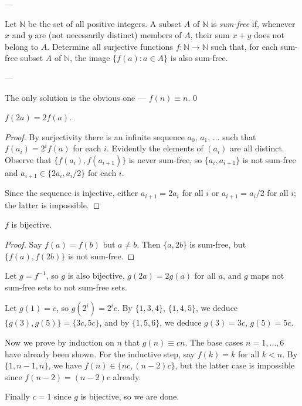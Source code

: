 
---

Let $\mathbb N$ be the set of all positive integers. A subset $A$ of $\mathbb N$ is \emph{sum-free} if, whenever $x$ and $y$ are (not necessarily distinct) members of $A$, their sum $x+y$ does not belong to $A$. Determine all surjective functions $f:\mathbb N\to\mathbb N$ such that, for each sum-free subset $A$ of $\mathbb N$, the image $\{f(a):a\in A\}$ is also sum-free.

---

The only solution is the obvious one --- $f(n)\equiv n$.
\setcounter{claim}0
\begin{claim}
    $f(2a)=2f(a)$.
\end{claim}
\begin{proof}
    By surjectivity there is an infinite sequence $a_0$, $a_1$, $\ldots$ such that $f(a_i)=2^if(a)$ for each $i$. Evidently the elements of $(a_i)$ are all distinct. Observe that $\{f(a_i),f(a_{i+1})\}$ is never sum-free, so $\{a_i,a_{i+1}\}$ is not sum-free and $a_{i+1}\in\{2a_i,a_i/2\}$ for each $i$.

    Since the sequence is injective, either $a_{i+1}=2a_i$ for all $i$ or $a_{i+1}=a_i/2$ for all $i$; the latter is impossible.
\end{proof}
\begin{claim}
    $f$ is bijective.
\end{claim}
\begin{proof}
    Say $f(a)=f(b)$ but $a\ne b$. Then $\{a,2b\}$ is sum-free, but $\{f(a),f(2b)\}$ is not sum-free.
\end{proof}

Let $g=f^{-1}$, so $g$ is also bijective, $g(2a)=2g(a)$ for all $a$, and $g$ maps not sum-free sets to not sum-free sets.

Let $g(1)=c$, so $g(2^i)=2^ic$. By $\{1,3,4\}$, $\{1,4,5\}$, we deduce $\{g(3),g(5)\}=\{3c,5c\}$, and by $\{1,5,6\}$, we deduce $g(3)=3c$, $g(5)=5c$.

Now we prove by induction on $n$ that $g(n)\equiv cn$. The base cases $n=1,\ldots,6$ have already been shown. For the inductive step, say $f(k)=k$ for all $k<n$. By $\{1,n-1,n\}$, we have $f(n)\in\{nc,(n-2)c\}$, but the latter case is impossible since $f(n-2)=(n-2)c$ already.

Finally $c=1$ since $g$ is bijective, so we are done.

